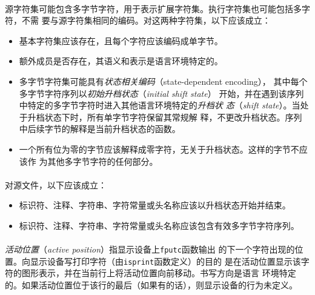 \paragraph{}
源字符集可能包含多字节字符，用于表示扩展字符集。执行字符集也可能包括多字符，不需
要与源字符集相同的编码。对这两种字符集，以下应该成立：
\begin{itemize}
  \item{基本字符集应该存在，且每个字符应该编码成单字节。}
  \item{额外成员是否存在，其语义和表示是语言环境特定的。}
  \item{多字节字符集可能具有\textit{状态相关编码}（state-dependent encoding），
    其中每个多字节字符序列以\textit{初始升档状态}（\textit{initial shift state}）
    开始，并在遇到该序列中特定的多字节字符时进入其他语言环境特定的\textit{升档状
    态}（\textit{shift state}）。当处于升档状态下时，所有单字节字符保留其常规解
    释，不更改升档状态。序列中后续字节的解释是当前升档状态的函数。}
  \item{一个所有位为零的字节应该解释成零字符，无关于升档状态。这样的字节不应该作
    为其他多字节字符的任何部分。}
\end{itemize}

\paragraph{}
对源文件，以下应该成立：
\begin{itemize}
  \item{标识符、注释、字符串、字符常量或头名称应该以升档状态开始并结束。}
  \item{标识符、注释、字符串、字符常量或头名称应该包含有效多字节字符序列。}
\end{itemize}

\paragraph{}
\textit{活动位置}（\textit{active position}）指显示设备上\texttt{fputc}函数输出
的下一个字符出现的位置。向显示设备写打印字符（由\texttt{isprint}函数定义）的目的
是在活动位置显示该字符的图形表示，并在当前行上将活动位置向前移动。书写方向是语言
环境特定的。如果活动位置位于该行的最后（如果有的话），则显示设备的行为未定义。

